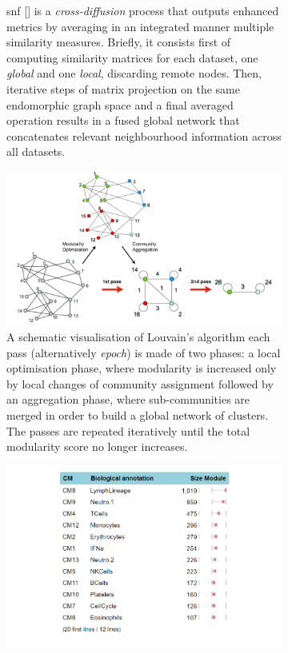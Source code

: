 \documentclass[mainlanguage=english,numlaboratories=2, nofrontcover=true,noaim=false, localbibs, colophon-location=verso-frontcover, oneside, 10pt, localtocs, version=final, nomakeabstract=true]{yathesis}
\begin{document}
{\begin{figure}
\begin{subfigure}[p]{0.4\textwidth}
         \caption{\acrshort{snf} [\autocite{wang_etal14}] is a \emph{cross-diffusion} process that outputs enhanced metrics by averaging in an integrated manner multiple similarity measures. Briefly, it consists first of computing similarity matrices for each dataset, one \emph{global} and one \emph{local}, discarding remote nodes. Then, iterative steps of matrix projection on the same endomorphic graph space and a final averaged operation results in a fused global network that concatenates relevant neighbourhood information across all datasets.}
         \label{subfig:snf-method}
     \end{subfigure}
     \hfill
     \begin{subfigure}[p]{0.4\textwidth}
         \centering
         \includegraphics[width=\textwidth]{figures/louvain_clustering.png}
         \caption{A schematic visualisation of Louvain's algorithm \autocite{blondel_etal08} each pass (alternatively \emph{epoch}) is made of two phases: a local optimisation phase, where modularity is increased only by local changes of community assignment followed by an aggregation phase, where sub-communities are merged in order to build a global network of clusters. The passes are repeated iteratively until the total modularity score no longer increases.}
         \label{subfig:louvain-method}
     \end{subfigure}        
    \vfill
     \begin{subfigure}[p]{0.4\textwidth}
         \centering
         \includegraphics[width=\textwidth]{figures/cheima_modules.png}

\end{subfigure}
\end{figure}}
\end{document}
